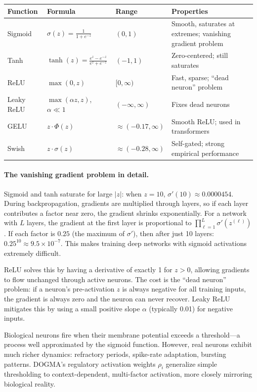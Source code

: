 \begin{center}
\renewcommand{\arraystretch}{1.3}
\begin{tabularx}{0.95\textwidth}{L{2.5cm} L{4cm} L{3.5cm} Y}
\toprule
\textbf{Function} & \textbf{Formula} & \textbf{Range} & \textbf{Properties} \\
\midrule
Sigmoid & $\sigma(z) = \frac{1}{1+e^{-z}}$ & $(0, 1)$ & Smooth, saturates at extremes; vanishing gradient problem \\
Tanh & $\tanh(z) = \frac{e^z - e^{-z}}{e^z + e^{-z}}$ & $(-1, 1)$ & Zero-centered; still saturates \\
ReLU & $\max(0, z)$ & $[0, \infty)$ & Fast, sparse; ``dead neuron'' problem \\
Leaky ReLU & $\max(\alpha z, z)$, $\alpha \ll 1$ & $(-\infty, \infty)$ & Fixes dead neurons \\
GELU & $z \cdot \Phi(z)$ & $\approx (-0.17, \infty)$ & Smooth ReLU; used in transformers \\
Swish & $z \cdot \sigma(z)$ & $\approx (-0.28, \infty)$ & Self-gated; strong empirical performance \\
\bottomrule
\end{tabularx}
\end{center}

\paragraph{The vanishing gradient problem in detail.} Sigmoid and tanh saturate for large $|z|$: when $z = 10$, $\sigma'(10) \approx 0.0000454$. During backpropagation, gradients are multiplied through layers, so if each layer contributes a factor near zero, the gradient shrinks exponentially. For a network with $L$ layers, the gradient at the first layer is proportional to $\prod_{\ell=1}^{L} \sigma'(z^{(\ell)})$. If each factor is $0.25$ (the maximum of $\sigma'$), then after just 10 layers: $0.25^{10} \approx 9.5 \times 10^{-7}$. This makes training deep networks with sigmoid activations extremely difficult.

ReLU solves this by having a derivative of exactly 1 for $z > 0$, allowing gradients to flow unchanged through active neurons. The cost is the ``dead neuron'' problem: if a neuron's pre-activation $z$ is always negative for all training inputs, the gradient is always zero and the neuron can never recover. Leaky ReLU mitigates this by using a small positive slope $\alpha$ (typically 0.01) for negative inputs.

\begin{bioinsight}
Biological neurons fire when their membrane potential exceeds a threshold---a process well approximated by the sigmoid function. However, real neurons exhibit much richer dynamics: refractory periods, spike-rate adaptation, bursting patterns. DOGMA's regulatory activation weights $\rho_i$ generalize simple thresholding to context-dependent, multi-factor activation, more closely mirroring biological reality.
\end{bioinsight}

